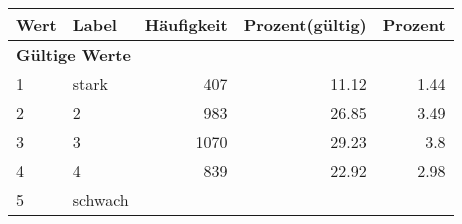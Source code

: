      \begin{longtable}{lXrrr}
     \toprule
     \textbf{Wert} & \textbf{Label} & \textbf{Häufigkeit} & \textbf{Prozent(gültig)} & \textbf{Prozent} \\
     \endhead
     \midrule
     \multicolumn{5}{l}{\textbf{Gültige Werte}}\\

     1 &
     \multicolumn{1}{X}{ stark   } &


       \num{407} &
       \num[round-mode=places,round-precision=2]{11.12} &
         \num[round-mode=places,round-precision=2]{1.44} \\

     2 &
     \multicolumn{1}{X}{ 2   } &


       \num{983} &
       \num[round-mode=places,round-precision=2]{26.85} &
         \num[round-mode=places,round-precision=2]{3.49} \\

     3 &
     \multicolumn{1}{X}{ 3   } &


       \num{1070} &
       \num[round-mode=places,round-precision=2]{29.23} &
         \num[round-mode=places,round-precision=2]{3.8} \\

     4 &
     \multicolumn{1}{X}{ 4   } &


       \num{839} &
       \num[round-mode=places,round-precision=2]{22.92} &
         \num[round-mode=places,round-precision=2]{2.98} \\

     5 &
     \multicolumn{1}{X}{ schwach   } &



\end{longtable}
